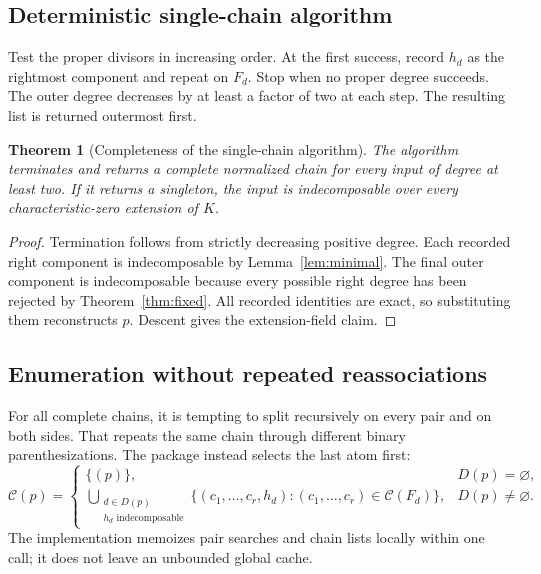 \documentclass[11pt,a4paper]{article}
\numberwithin{equation}{section}
\newtheorem{theorem}{Theorem}[section]
\theoremstyle{definition}
\theoremstyle{remark}
\begin{document}
\subsection{Deterministic single-chain algorithm}
Test the proper divisors in increasing order. At the first success, record
$h_d$ as the rightmost component and repeat on $F_d$. Stop when no proper
degree succeeds. The outer degree decreases by at least a factor of two at
each step. The resulting list is returned outermost first.

\begin{theorem}[Completeness of the single-chain algorithm]
The algorithm terminates and returns a complete normalized chain for every
input of degree at least two. If it returns a singleton, the input is
indecomposable over every characteristic-zero extension of $K$.
\end{theorem}
\begin{proof}
Termination follows from strictly decreasing positive degree. Each recorded
right component is indecomposable by Lemma~\ref{lem:minimal}. The final outer
component is indecomposable because every possible right degree has been
rejected by Theorem~\ref{thm:fixed}. All recorded identities are exact, so
substituting them reconstructs $p$. Descent gives the extension-field claim.
\end{proof}

\subsection{Enumeration without repeated reassociations}
For all complete chains, it is tempting to split recursively on every pair
and on both sides. That repeats the same chain through different binary
parenthesizations. The package instead selects the last atom first:
\begin{equation}
 \mathcal C(p)=
 \begin{cases}
  \{(p)\}, & D(p)=\varnothing,\\[2pt]
  \displaystyle\bigcup_{\substack{d\in D(p)\\h_d\text{ indecomposable}}}
       \{(c_1,\ldots,c_r,h_d):
                          (c_1,\ldots,c_r)\in\mathcal C(F_d)\},
       & D(p)\ne\varnothing.
 \end{cases}
 \label{eq:enumeration}
\end{equation}
The implementation memoizes pair searches and chain lists locally within
one call; it does not leave an unbounded global cache.
\end{document}
